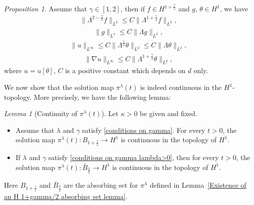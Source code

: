 \documentclass[reqno]{amsart}%
\theoremstyle{definition}
\theoremstyle{remark}
\numberwithin{equation}{section}
\newtheorem{lemma}[theorem]{Lemma}
\newtheorem{proposition}[theorem]{Proposition}
\newcommand{\1}{\mathbf{1}}
\newcommand{\pin}{\pi^{\lambda}}
\numberwithin{equation}{section}
\numberwithin{theorem}{section}
\numberwithin{figure}{section}
\begin{document}
\begin{proposition}\label{auxiliary estimates on u with gamma>1}
Assume that $\gamma\in[1,2]$, then if $f\in H^{1+\frac{\gamma}{2}}$ and $g$, $\theta\in H^1$, we have 
\begin{align}\label{bound on Lambda theta for gamma>1}
\|\Lambda^{2-\frac{\gamma}{2}}f\|_{L^2}\le C\|\Lambda^{1+\frac{\gamma}{2}}f\|_{L^2},
\end{align}
\begin{align}\label{bound on L4 using H1}
\|g\|_{L^4}\le C\|\Lambda g\|_{L^2},
\end{align}
\begin{align}\label{bound on u in terms of nabla theta}
\|u\|_{L^\infty}\le C\|\Lambda^\frac{\gamma}{2}\theta\|_{L^2}\le C\|\Lambda\theta\|_{L^2},
\end{align}
\begin{align}\label{bound on nabla u in terms of nabla theta}
\|\nabla u\|_{L^\infty}\le C\|\Lambda^{1+\frac{\gamma}{2}}\theta\|_{L^2},
\end{align}
where $u=u[\theta]$, $C$ is a positive constant which depends on $d$ only.
\end{proposition}

We now show that the solution map $\pin(t)$ is indeed continuous in the $H^1$-topology. More precisely, we have the following lemma:

\begin{lemma}[Continuity of $\pin(t)$]\label{continuity of solution map lemma}
Let $\kappa>0$ be given and fixed.
\begin{itemize}
\item Assume that $\lambda$ and $\gamma$ satisfy \eqref{conditions on gamma}. For every $t>0$, the solution map $\pin(t):B_{1+\frac{\gamma}{2}}\to H^1$ is continuous in the topology of $H^1$.
\item If $\lambda$ and $\gamma$ satisfy \eqref{conditions on gamma lambda>0}, then for every $t>0$, the solution map $\pin(t):\bar{B}_{\frac{3}{2}}\to H^1$ is continuous in the topology of $H^1$. 
\end{itemize} 
Here $B_{1+\frac{\gamma}{2}}$ and $\bar{B}_{\frac{3}{2}}$ are the absorbing set for $\pin$ defined in Lemma~\ref{Existence of an H 1+gamma/2 absorbing set lemma}.
\end{lemma}
\end{document}
